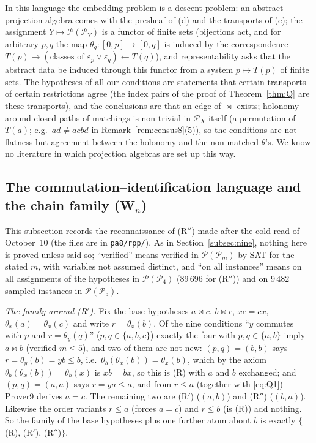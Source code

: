 \documentclass[11pt]{amsart}
\theoremstyle{definition}
\renewcommand{\P}{\mathcal{P}}
\newcommand{\mt}{\bowtie}   %
\begin{document}
In this language the embedding problem is a descent problem: an abstract projection algebra comes with the presheaf of (d) and the transports of (c); the assignment $Y\mapsto\P(\P_Y)$ is a functor of finite sets (bijections act, and for arbitrary $p,q$ the map $\theta_q\colon[0,p]\to[0,q]$ is induced by the correspondence $T(p)\to(\text{classes of }\varepsilon_p\vee\varepsilon_q)\leftarrow T(q)$), and representability asks that the abstract data be induced through this functor from a system $p\mapsto T(p)$ of finite sets. The hypotheses of all our conditions are statements that certain transports of certain restrictions agree (the index pairs of the proof of Theorem~\ref{thm:Q} are these transports), and the conclusions are that an edge of $\mt$ exists; holonomy around closed paths of matchings is non-trivial in $\P_X$ itself (a permutation of $T(a)$; e.g.\ $ad\ne acbd$ in Remark~\ref{rem:census8}(5)), so the conditions are not flatness but agreement between the holonomy and the non-matched $\theta$'s. We know no literature in which projection algebras are set up this way.

\subsection{The commutation--identification language and the chain family (W$_n$)}\label{subsec:chain}

This subsection records the reconnaissance of (R$''$) made after the cold read of October~10 (the files are in \texttt{pa8/rpp/}). As in Section~\ref{subsec:nine}, nothing here is proved unless said so; ``verified'' means verified in $\P(\P_m)$ by SAT for the stated $m$, with variables not assumed distinct, and ``on all instances'' means on all assignments of the hypotheses in $\P(\P_4)$ ($89\,696$ for (R$''$)) and on $9\,482$ sampled instances in $\P(\P_5)$.

\smallskip
\emph{The family around (R$'$).} Fix the base hypotheses $a\mt c$, $b\mt c$, $xc=cx$, $\theta_x(a)=\theta_x(c)$ and write $r=\theta_x(b)$. Of the nine conditions ``$y$ commutes with $p$ and $r=\theta_y(q)$'' ($p,q\in\{a,b,c\}$) exactly the four with $p,q\in\{a,b\}$ imply $a\mt b$ (verified $m\le5$), and two of them are not new: $(p,q)=(b,b)$ says $r=\theta_y(b)=yb\le b$, i.e.\ $\theta_b(\theta_x(b))=\theta_x(b)$, which by the axiom $\theta_b(\theta_x(b))=\theta_b(x)$ is $xb=bx$, so this is (R) with $a$ and $b$ exchanged; and $(p,q)=(a,a)$ says $r=ya\le a$, and from $r\le a$ (together with \eqref{eq:Q1}) Prover9 derives $a=c$. The remaining two are (R$'$) ($(a,b)$) and (R$''$) ($(b,a)$). Likewise the order variants $r\le a$ (forces $a=c$) and $r\le b$ (is (R)) add nothing. So the family of the base hypotheses plus one further atom about $b$ is exactly $\{$(R), (R$'$), (R$''$)$\}$.
\end{document}
